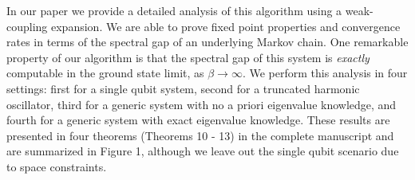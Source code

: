 \documentclass[11pt]{article}
\newcommand{\norm}[1]{\left|\left| #1 \right|\right|}
\begin{document}


In our paper we provide a detailed analysis of this algorithm using a weak-coupling expansion. We are able to prove fixed point properties and convergence rates in terms of the spectral gap of an underlying Markov chain. One remarkable property of our algorithm is that the spectral gap of this system is \emph{exactly} computable in the ground state limit, as $\beta \to \infty$. We perform this analysis in four settings: first for a single qubit system, second for a truncated harmonic oscillator, third for a generic system with no a priori eigenvalue knowledge, and fourth for a generic system with exact eigenvalue knowledge. These results are presented in four theorems (Theorems 10 - 13) in the complete manuscript and are summarized in Figure 1, although we leave out the single qubit scenario due to space constraints. 
\end{document}
